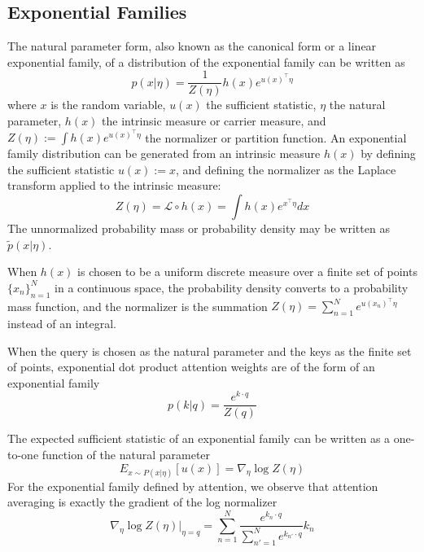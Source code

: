 \documentclass{article}
\begin{document}
\subsection{Exponential Families}
\label{exponential families}
The natural parameter form, also known as the canonical form or a linear exponential family, of a distribution of the exponential family can be written as
\begin{equation}
  p(x \vert \eta) = 
    \frac{1}{Z \left( \eta \right) }
    h(x)
    e^{ u(x)^\intercal \eta}
  \label{exponential family}
\end{equation}
where $x$ is the random variable, 
$u(x)$ the sufficient statistic, 
$\eta$ the natural parameter, 
$h(x)$ the intrinsic measure or carrier measure, 
and 
$Z ( \eta ) := \int h(x) e^{ u(x)^\intercal \eta }$ the normalizer or partition function.
An exponential family distribution can be generated from an intrinsic measure $h(x)$ by defining the sufficient statistic $u(x) := x$, and defining the normalizer as the Laplace transform applied to the intrinsic measure:
\begin{equation}
  Z ( \eta ) = \mathcal{L} \circ h(x) = \int h(x) e^{ x^\intercal \eta} dx
  \label{Laplace transform}
\end{equation}
The unnormalized probability mass or probability density may be written as $\tilde{p}(x \vert \eta)$.

When $h(x)$ is chosen to be a uniform discrete measure over a finite set of points 
$\{x_n\}_{n=1}^N $
in a continuous space, the probability density converts to a probability mass function, and the normalizer is the summation 
$Z( \eta ) = \sum_{n=1}^N e^{ u(x_n)^\intercal \eta} $
instead of an integral.

When the query is chosen as the natural parameter and the keys as the finite set of points, exponential dot product attention weights are of the form of an exponential family
\begin{equation}
  p( k \vert q ) = 
  \frac
    { e^{k \cdot q } }
    { Z(q) }
  \label{exponential family attention}
\end{equation}

The expected sufficient statistic of an exponential family can be written as a one-to-one function of the natural parameter
\begin{equation}
  E_{ x \sim P( x \vert \eta) } \left[ u(x) \right] =
  \nabla_\eta \log Z(\eta)
  \label{activation function}
\end{equation}
For the exponential family defined by attention, we observe that attention averaging is exactly the gradient of the log normalizer
\begin{equation}
  \nabla_\eta \log Z(\eta) \vert_{\eta = q} = 
  \sum_{n=1}^N 
    \frac
      { e^{ k_n \cdot q } }
      { \sum_{n'=1}^N e^{k_{n'} \cdot q} }
    k_n
  \label{attention gradient update}
\end{equation}
\end{document}
